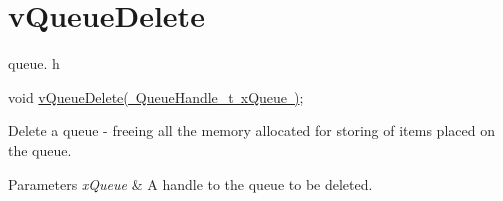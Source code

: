 \hypertarget{group__v_queue_delete}{}\section{v\+Queue\+Delete}
\label{group__v_queue_delete}
queue. h 
\begin{DoxyPre}void \mbox{\hyperlink{queue_8h_a707cbcfe3aed6b877b6aa6d9d75a3f22}{vQueueDelete( QueueHandle\_t xQueue )}};\end{DoxyPre}


Delete a queue -\/ freeing all the memory allocated for storing of items placed on the queue.


\begin{DoxyParams}{Parameters}
{\em x\+Queue} & A handle to the queue to be deleted. \\
\hline
\end{DoxyParams}
